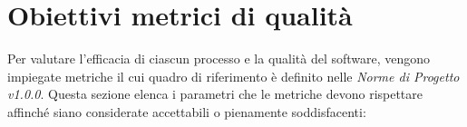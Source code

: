 \section{Obiettivi metrici di qualità}
Per valutare l'efficacia di ciascun processo e la qualità del software, vengono impiegate metriche il cui quadro di riferimento è definito nelle \textit{Norme di Progetto v1.0.0}. Questa sezione elenca i parametri che le metriche devono rispettare affinché siano considerate accettabili o pienamente soddisfacenti:






